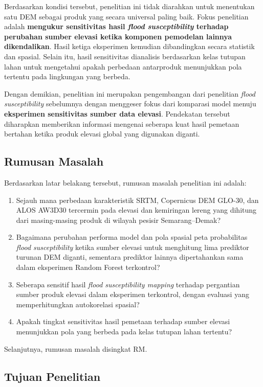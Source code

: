 \documentclass[12pt]{article}
\begin{document}
Berdasarkan kondisi tersebut, penelitian ini tidak diarahkan untuk menentukan
satu DEM sebagai produk yang secara universal paling baik. Fokus penelitian
adalah \textbf{mengukur sensitivitas hasil \textit{flood susceptibility}
terhadap perubahan sumber elevasi ketika komponen pemodelan lainnya
dikendalikan}. Hasil ketiga eksperimen kemudian dibandingkan secara statistik
dan spasial. Selain itu, hasil sensitivitas dianalisis berdasarkan kelas
tutupan lahan untuk mengetahui apakah perbedaan antarproduk menunjukkan pola
tertentu pada lingkungan yang berbeda.

Dengan demikian, penelitian ini merupakan pengembangan dari penelitian
\textit{flood susceptibility} sebelumnya dengan menggeser fokus dari
komparasi model menuju \textbf{eksperimen sensitivitas sumber data elevasi}.
Pendekatan tersebut diharapkan memberikan informasi mengenai seberapa kuat
hasil pemetaan bertahan ketika produk elevasi global yang digunakan diganti.

\subsection{Rumusan Masalah}

Berdasarkan latar belakang tersebut, rumusan masalah penelitian ini adalah:

\begin{enumerate}
\item Sejauh mana perbedaan karakteristik SRTM, Copernicus DEM GLO-30, dan
ALOS AW3D30 tercermin pada elevasi dan kemiringan lereng yang dihitung
dari masing-masing produk di wilayah pesisir Semarang--Demak?
\item Bagaimana perubahan performa model dan pola spasial peta probabilitas
\textit{flood susceptibility} ketika sumber elevasi untuk menghitung lima
prediktor turunan DEM diganti, sementara prediktor lainnya dipertahankan sama
dalam eksperimen Random Forest terkontrol?
\item Seberapa sensitif hasil \textit{flood susceptibility mapping}
terhadap pergantian sumber produk elevasi dalam eksperimen terkontrol,
dengan evaluasi yang memperhitungkan autokorelasi spasial?
\item Apakah tingkat sensitivitas hasil pemetaan terhadap sumber elevasi
menunjukkan pola yang berbeda pada kelas tutupan lahan tertentu?
\end{enumerate}

Selanjutnya, rumusan masalah disingkat RM.

\subsection{Tujuan Penelitian}
\end{document}
